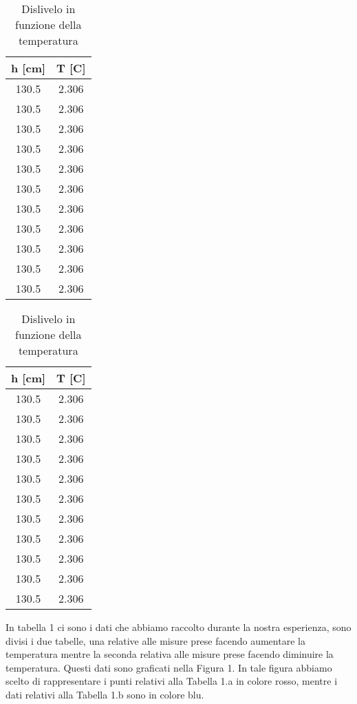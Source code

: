 \begin{table}[H]
\centering

	\begin{subtable}{.5\textwidth}
		\centering
		\begin{tabular}{|c|c|} \hline
			\textbf{h {[cm]} } & \textbf{T {[\degree C]} }  \\ \hline
			130.5 & 2.306  \\ \hline
			130.5 & 2.306  \\ \hline
			130.5 & 2.306  \\ \hline
			130.5 & 2.306  \\ \hline
			130.5 & 2.306  \\ \hline
			130.5 & 2.306  \\ \hline
			130.5 & 2.306  \\ \hline
			130.5 & 2.306  \\ \hline
			130.5 & 2.306  \\ \hline
			130.5 & 2.306  \\ \hline
			130.5 & 2.306  \\ \hline
		\end{tabular}
		\caption{Aumentando la temperatura}
	\end{subtable}%
	\begin{subtable}{.5\textwidth}
	\centering
	\begin{tabular}{|c|c|} \hline
		\textbf{h {[cm]} } & \textbf{T {[\degree C]} }  \\ \hline
		130.5 & 2.306  \\ \hline
		130.5 & 2.306  \\ \hline
		130.5 & 2.306  \\ \hline
		130.5 & 2.306  \\ \hline
		130.5 & 2.306  \\ \hline
		130.5 & 2.306  \\ \hline
		130.5 & 2.306  \\ \hline
		130.5 & 2.306  \\ \hline
		130.5 & 2.306  \\ \hline
		130.5 & 2.306  \\ \hline
		130.5 & 2.306  \\ \hline
	\end{tabular}
	\caption{Diminuendoo la temperatura}
\end{subtable}

\caption{Dislivelo in funzione della temperatura}
\end{table}
In tabella 1 ci sono i dati che abbiamo raccolto durante la nostra esperienza, sono divisi i due tabelle, una relative alle misure prese facendo aumentare la temperatura mentre la seconda relativa alle misure prese facendo diminuire la temperatura. Questi dati sono graficati nella Figura 1. In tale figura abbiamo scelto di rappresentare i punti relativi alla Tabella 1.a in colore rosso, mentre i dati relativi alla Tabella 1.b sono in colore blu.\\
